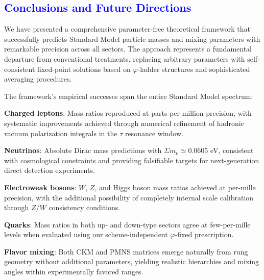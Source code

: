 \documentclass[%
amsmath,amssymb,
aps,
prb,
floatfix, showkeys, 10pt,
]{revtex4-2}
\newcommand{\modif}[1]{\textcolor{blue}{#1}}
\begin{document}
{\modif{\section{Conclusions and Future Directions}
\label{sec:conclude}  }}
We have presented a comprehensive parameter-free theoretical framework that successfully predicts Standard Model particle masses and mixing parameters with remarkable precision across all sectors. The approach represents a fundamental departure from conventional treatments, replacing arbitrary parameters with self-consistent fixed-point solutions based on $\varphi$-ladder structures and sophisticated averaging procedures.

The framework's empirical successes span the entire Standard Model spectrum:

\textbf{Charged leptons}: Mass ratios reproduced at parts-per-million precision, with systematic improvements achieved through numerical refinement of hadronic vacuum polarization integrals in the $\tau$ resonance window.

\textbf{Neutrinos}: Absolute Dirac mass predictions with $\Sigma m_\nu \simeq 0.0605$ eV, consistent with cosmological constraints and providing falsifiable targets for next-generation direct detection experiments.

\textbf{Electroweak bosons}: $W$, $Z$, and Higgs boson mass ratios achieved at per-mille precision, with the additional possibility of completely internal scale calibration through $Z/W$ consistency conditions.

\textbf{Quarks}: Mass ratios in both up- and down-type sectors agree at few-per-mille levels when evaluated using our scheme-independent $\varphi$-fixed prescription.

\textbf{Flavor mixing}: Both CKM and PMNS matrices emerge naturally from rung geometry without additional parameters, yielding realistic hierarchies and mixing angles within experimentally favored ranges.
\end{document}
